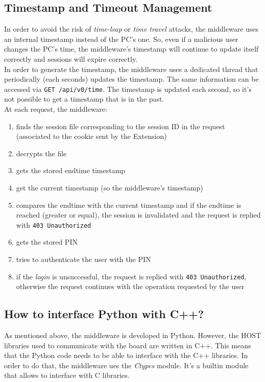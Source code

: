 \subsection{Timestamp and Timeout Management}
In order to avoid the risk of \textit{time-leap} or \textit{time travel} attacks, the middleware uses an internal timestamp instead of the PC's one. So, even if a malicious user changes the PC's time, the middleware's timestamp will continue to update itself correctly and sessions will expire correctly.\\

In order to generate the timestamp, the middleware uses a dedicated thread that periodically (each seconds) updates the timestamp. The same information can be accessed via \texttt{GET /api/v0/time}. The timestamp is updated each second, so it's not possible to get a timestamp that is in the past.\\

At each request, the middleware:

\begin{enumerate}
    \item finds the session file corresponding to the session ID in the request (associated to the cookie sent by the Extension)
    \item decrypts the file
    \item gets the stored endtime timestamp
    \item get the current timestamp (so the middleware's timestamp)
    \item compares the endtime with the current timestamp and if the endtime is reached (greater or equal), the session is invalidated and the request is replied with \texttt{403 Unauthorized}
    \item gets the stored PIN
    \item tries to authenticate the user with the PIN
    \item if the \textit{login} is unsuccessful, the request is replied with \texttt{403 Unauthorized}, otherwise the request continues with the operation requested by the user 
\end{enumerate}

\subsection{How to interface Python with C++?}
As mentioned above, the middleware is developed in Python. However, the HOST libraries used to communicate with the board are written in C++. This means that the Python code needs to be able to interface with the C++ libraries. In order to do that, the middleware ues the \textit{Ctypes} module. It's a builtin module that allows to interface with C libraries.\\

